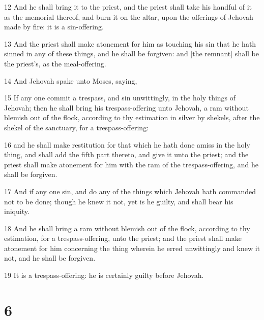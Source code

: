 \par 12 And he shall bring it to the priest, and the priest shall take his handful of it as the memorial thereof, and burn it on the altar, upon the offerings of Jehovah made by fire: it is a sin-offering.
\par 13 And the priest shall make atonement for him as touching his sin that he hath sinned in any of these things, and he shall be forgiven: and [the remnant] shall be the priest's, as the meal-offering.
\par 14 And Jehovah spake unto Moses, saying,
\par 15 If any one commit a trespass, and sin unwittingly, in the holy things of Jehovah; then he shall bring his trespass-offering unto Jehovah, a ram without blemish out of the flock, according to thy estimation in silver by shekels, after the shekel of the sanctuary, for a trespass-offering:
\par 16 and he shall make restitution for that which he hath done amiss in the holy thing, and shall add the fifth part thereto, and give it unto the priest; and the priest shall make atonement for him with the ram of the trespass-offering, and he shall be forgiven.
\par 17 And if any one sin, and do any of the things which Jehovah hath commanded not to be done; though he knew it not, yet is he guilty, and shall bear his iniquity.
\par 18 And he shall bring a ram without blemish out of the flock, according to thy estimation, for a trespass-offering, unto the priest; and the priest shall make atonement for him concerning the thing wherein he erred unwittingly and knew it not, and he shall be forgiven.
\par 19 It is a trespass-offering: he is certainly guilty before Jehovah.

\chapter{6}

